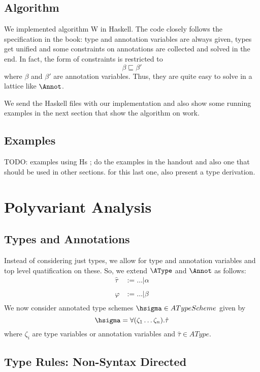\documentclass[a4wide,12pt]{article}
\theoremstyle{definition}
\theoremstyle{plain}
\theoremstyle{remark}
\def\sqleq{\sqsubseteq}
\def\htau{\hat{\tau}}
\begin{document}
\subsection{Algorithm}

We implemented algorithm W in Haskell. The code closely follows the specification in the book:
type and annotation variables are always given, types get unified and some constraints on annotations
are collected and solved in the end. In fact, the form of constraints is restricted to
\[\beta \sqleq \beta'\]
where $\beta$ and $\beta'$ are annotation variables.
Thus, they are quite easy to solve in a lattice like $\Annot$.

We send the Haskell files with our implementation and also show some running examples in the
next section that show the algorithm on work.

\subsection{Examples}

TODO: examples using Hs ; do the examples in the handout and also one that should be used in other sections. for this last one, also present a type derivation.

\section{Polyvariant Analysis}

\subsection{Types and Annotations}

Instead of considering just types, we allow for type and annotation variables and top level quatification
on these. So, we extend $\AType$ and $\Annot$ as follows:
\begin{eqnarray*}
\htau & := \ldots  | \alpha \\ 
\\
\varphi & := \ldots  | \beta \\
\end{eqnarray*}
We now consider annotated type schemes $\hsigma \in ATypeScheme$ given by
\[\hsigma = \forall (\zeta_1 \ldots \zeta_n). \htau\]
where $\zeta_i$ are type variables or annotation variables and $\htau \in AType$.

\subsection{Type Rules: Non-Syntax Directed}
\end{document}
